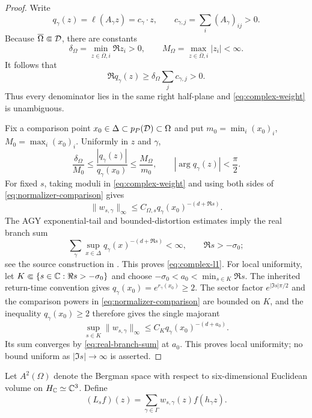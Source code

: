 \begin{proof}
Write
\[
 q_\gamma(z)=\ell(A_\gamma z)=c_\gamma\cdot z,
 \qquad c_{\gamma,j}=\sum_i(A_\gamma)_{ij}>0.
\]
Because \(\overline\Omega\Subset\mathcal{D}\), there are constants
\[
 \delta_\Omega=\min_{z\in\overline\Omega,i}\Re z_i>0,
 \qquad
 M_\Omega=\max_{z\in\overline\Omega,i}|z_i|<\infty.
\]
It follows that
\[
 \Re q_\gamma(z)
 \geq\delta_\Omega\sum_jc_{\gamma,j}>0.
\]
Thus every denominator lies in the same right half-plane and
\eqref{eq:complex-weight} is unambiguous.

 Fix a comparison point
 \(x_0\in\Delta\subset p_P(\mathcal{D})\subset\Omega\) and put
\(m_0=\min_i(x_0)_i\), \(M_0=\max_i(x_0)_i\).  Uniformly in \(z\) and
\(\gamma\),
\begin{equation}
 \frac{\delta_\Omega}{M_0}
 \leq\frac{|q_\gamma(z)|}{q_\gamma(x_0)}
 \leq\frac{M_\Omega}{m_0},
 \qquad |\arg q_\gamma(z)|<\frac{\pi}{2}.
 \label{eq:normalizer-comparison}
\end{equation}
For fixed \(s\), taking moduli in \eqref{eq:complex-weight} and using both
sides of \eqref{eq:normalizer-comparison} gives
\[
 \|w_{s,\gamma}\|_\infty
 \leq C_{\Omega,s}
 q_\gamma(x_0)^{-(d+\Re s)}.
\]
The AGY exponential-tail and bounded-distortion estimates imply the real
branch sum
\begin{equation}
 \sum_\gamma\sup_{x\in\Delta}
 q_\gamma(x)^{-(d+\Re s)}<\infty,
 \qquad \Re s> -\sigma_0;
 \label{eq:real-branch-sum}
\end{equation}
see the source construction in \citet{agy2006}.  This proves
\eqref{eq:complex-l1}.  For local uniformity, let
\(K\Subset\{s\in\mathbb{C}:\Re s>-\sigma_0\}\) and choose
\(-\sigma_0<a_0<\min_{s\in K}\Re s\).  The inherited return-time convention
gives \(q_\gamma(x_0)=e^{r_\gamma(x_0)}\geq2\).  The sector factor
\(e^{|\Im s|\pi/2}\) and the comparison powers in
\eqref{eq:normalizer-comparison} are bounded on \(K\), and the inequality
\(q_\gamma(x_0)\geq2\) therefore gives the single majorant
\[
 \sup_{s\in K}\|w_{s,\gamma}\|_\infty
 \leq C_K q_\gamma(x_0)^{-(d+a_0)}.
\]
Its sum converges by \eqref{eq:real-branch-sum} at \(a_0\).  This proves
local uniformity; no bound uniform as \(|\Im s|\to\infty\) is asserted.
\end{proof}

Let \(A^2(\Omega)\) denote the Bergman space with respect to
six-dimensional Euclidean volume on \(H_{\mathbb{C}}\simeq\mathbb{C}^3\).  Define
\begin{equation}
 (L_sf)(z)=\sum_{\gamma\in\Gamma}
 w_{s,\gamma}(z)f(h_\gamma z).
 \label{eq:scalar-transfer}
\end{equation}

